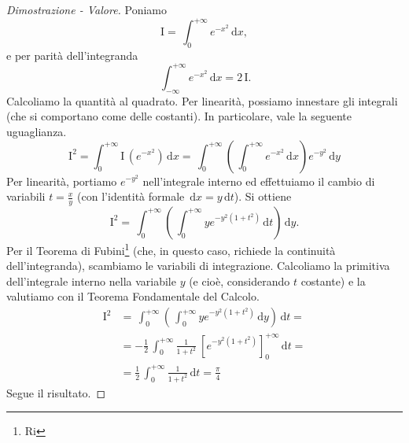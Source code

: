 \begin{proof}[Dimostrazione - Valore]
	Poniamo
	\begin{equation*}
		\mathrm{I} = 
		\, \int_{0}^{+ \infty}e^{-x^2} \, \mathrm{d}x,
	\end{equation*}
	e per parità dell'integranda
	\begin{equation*}
		\, \int_{- \infty}^{+ \infty}e^{-x^2} \, \mathrm{d}x = 
		2 \, \mathrm{I}.
	\end{equation*}
	Calcoliamo la quantità al quadrato. Per linearità, possiamo innestare gli integrali (che si comportano come delle costanti). 
	In particolare, vale la seguente uguaglianza.
	\begin{equation*}
		\mathrm{I}^2 = 
		\int_{0}^{+ \infty} \mathrm{I} \, \left(e^{-x^2} \right) \, \mathrm{d}x=
		\, \int_{0}^{+ \infty} \left( \, \int_{0}^{+ \infty} e^{-x^2} \, \mathrm{d}x \right) e^{-y^2} \, \mathrm{d}y
	\end{equation*}
	Per linearità, portiamo $e^{-y^2}$ nell'integrale interno ed effettuiamo il cambio di variabili $t = \frac{x}{y}$ (con l'identità formale $ \, \mathrm{d}x=y \, \mathrm{d}t$). Si ottiene
	\begin{equation*}
		\mathrm{I}^2 = 
		\, \int_{0}^{+ \infty} \left( \, \int_{0}^{+ \infty} ye^{-y^2(1+t^2)} \, \mathrm{d}t \right) \, \mathrm{d}y.
	\end{equation*}
	Per il Teorema di Fubini\footnote{Ri} (che, in questo caso, richiede la continuità dell'integranda), scambiamo le variabili di integrazione. 
	Calcoliamo la primitiva dell'integrale interno nella variabile $y$ (e cioè, considerando $t$ costante) e la valutiamo con il Teorema Fondamentale del Calcolo.
	\begin{equation*}
		\begin{split}
			\mathrm{I}^2 
			& =
			\, \int_{0}^{+ \infty} \left( \, \int_{0}^{+ \infty} ye^{-y^2(1+t^2)} \, \mathrm{d}y \right) \, \mathrm{d}t= 
			\\ &=
			- \frac{1}{2} \, \int_{0}^{+ \infty} \frac{1}{1+t^2} \ \left[ e^{-y^2(1+t^2)} \right]_{0}^{+ \infty} \, \mathrm{d}t= 
			\\ &= 
			\frac{1}{2} \, \int_{0}^{+ \infty} \frac{1}{1+t^2} \, \mathrm{d}t = \frac{ \pi}{4}
		\end{split}
	\end{equation*}
	Segue il risultato.
\end{proof}
\pagebreak

